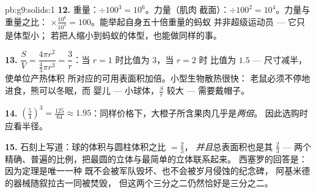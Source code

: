 \begin{solution}{pb:g9:solids:1}
\textbf{12.} 重量：$\div 100^3 = 10^6$。力量（肌肉
截面）：$\div 100^2 = 10^4$。力量与重量之比：
$\times \frac{10^6}{10^4} = 100$。能举起自身五十倍重量的蚂蚁
并非超级运动员 --- 它只是体型小；
若把人缩小到蚂蚁的体型，也能做同样的事。

\textbf{13.} $\dfrac{S}{V} = \dfrac{4\pi r^2}{\frac43\pi r^3}
= \dfrac{3}{r}$：当 $r = 1$ 时比值为 $3$，当 $r = 2$ 时
比值为 $1.5$ --- 尺寸减半，使单位产热体积
所对应的可用表面积加倍。小型生物散热很快：
老鼠必须不停地进食，熊可以冬眠，而
婴儿 --- 小球体，$\frac Sr$ 较大 --- 需要戴帽子。

\textbf{14.} $\left(\frac54\right)^3 = \frac{125}{64} \approx
1.95$：同样价格下，大橙子所含果肉几乎是\emph{两倍}。
因此选购时应看半径。

\textbf{15.} 石刻上写道：球的体积与圆柱体积之比 $= \frac23$，
\emph{并且}总表面积也是其 $\frac23$ ---
两个精确、普遍的比例，把最圆的立体与最简单的立体联系起来。
西塞罗的回答是：因为定理是唯一一种
既不会被军队毁坏、也不会被岁月侵蚀的纪念碑，
阿基米德的器械随叙拉古一同被焚毁，
但这两个三分之二仍然恰好是三分之二。
\end{solution}

